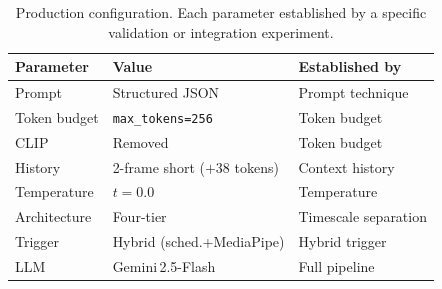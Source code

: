 \documentclass[journal]{IEEEtran}
\begin{document}
\begin{table}[t]
  \caption{Production configuration. Each parameter established
    by a specific validation or integration experiment.}
  \label{tab:config}
  \centering
  \small
  \begin{tabular}{lll}
    \toprule
    Parameter & Value & Established by \\
    \midrule
    Prompt       & Structured JSON              & Prompt technique \\
    Token budget & \texttt{max\_tokens=256}     & Token budget \\
    CLIP         & Removed                      & Token budget \\
    History      & 2-frame short ($+$38 tokens) & Context history \\
    Temperature  & $t=0.0$                      & Temperature \\
    Architecture & Four-tier                    & Timescale separation \\
    Trigger      & Hybrid (sched.+MediaPipe)    & Hybrid trigger \\
    LLM          & Gemini\,2.5-Flash            & Full pipeline \\
    \bottomrule
  \end{tabular}
\end{table}



\end{document}
